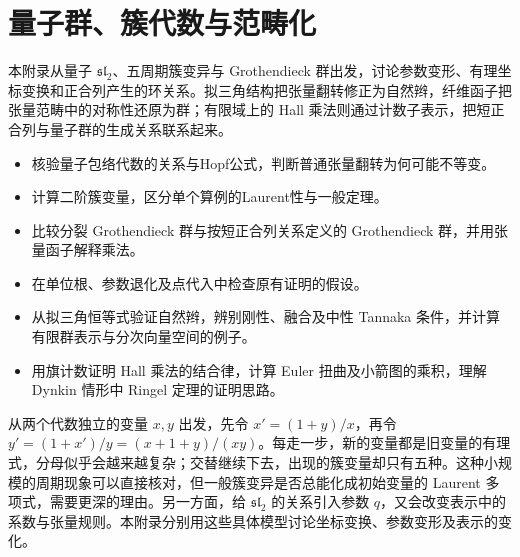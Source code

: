 %
%
\chapter{量子群、簇代数与范畴化}
\label{b5:app:B}
\begin{chapterabstract}
	本附录从量子 \(\mathfrak{sl}_2\)、五周期簇变异与 Grothendieck 群出发，讨论参数变形、有理坐标变换和正合列产生的环关系。拟三角结构把张量翻转修正为自然辫，纤维函子把张量范畴中的对称性还原为群；有限域上的 Hall 乘法则通过计数子表示，把短正合列与量子群的生成关系联系起来。
\end{chapterabstract}
\begin{learninggoals}
	\begin{itemize}
		\item 核验量子包络代数的关系与Hopf公式，判断普通张量翻转为何可能不等变。
		\item 计算二阶簇变量，区分单个算例的Laurent性与一般定理。
		\item 比较分裂 Grothendieck 群与按短正合列关系定义的 Grothendieck 群，并用张量函子解释乘法。
		\item 在单位根、参数退化及点代入中检查原有证明的假设。
		\item 从拟三角恒等式验证自然辫，辨别刚性、融合及中性 Tannaka 条件，并计算有限群表示与分次向量空间的例子。
		\item 用旗计数证明 Hall 乘法的结合律，计算 Euler 扭曲及小箭图的乘积，理解 Dynkin 情形中 Ringel 定理的证明思路。
	\end{itemize}
\end{learninggoals}

从两个代数独立的变量 \(x,y\) 出发，先令 \(x'=(1+y)/x\)，再令 \(y'=(1+x')/y=(x+1+y)/(xy)\)。每走一步，新的变量都是旧变量的有理式，分母似乎会越来越复杂；交替继续下去，出现的簇变量却只有五种。这种小规模的周期现象可以直接核对，但一般簇变异是否总能化成初始变量的 Laurent 多项式，需要更深的理由。另一方面，给 \(\mathfrak{sl}_2\) 的关系引入参数 \(q\)，又会改变表示中的系数与张量规则。本附录分别用这些具体模型讨论坐标变换、参数变形及表示的变化。

